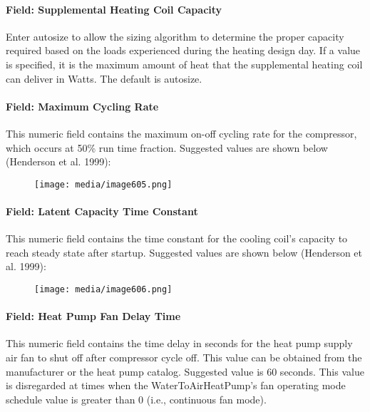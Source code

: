 \paragraph{Field: Supplemental Heating Coil Capacity}\label{field-supplemental-heating-coil-capacity-1}

Enter autosize to allow the sizing algorithm to determine the proper capacity required based on the loads experienced during the heating design day. If a value is specified, it is the maximum amount of heat that the supplemental heating coil can deliver in Watts. The default is autosize.

\paragraph{Field: Maximum Cycling Rate}\label{field-maximum-cycling-rate-000}

This numeric field contains the maximum on-off cycling rate for the compressor, which occurs at 50\% run time fraction. Suggested values are shown below (Henderson et al. 1999):

\begin{figure}[htbp]
\centering
\texttt{[image: media/image605.png]}
\caption{}
\end{figure}

\paragraph{Field: Latent Capacity Time Constant}\label{field-heat-pump-time-constant}

This numeric field contains the time constant for the cooling coil's capacity to reach steady state after startup. Suggested values are shown below (Henderson et al. 1999):

\begin{figure}[htbp]
\centering
\texttt{[image: media/image606.png]}
\caption{}
\end{figure}

\paragraph{Field: Heat Pump Fan Delay Time}\label{field-heat-pump-fan-delay-time}

This numeric field contains the time delay in seconds for the heat pump supply air fan to shut off after compressor cycle off. This value can be obtained from the manufacturer or the heat pump catalog. Suggested value is 60 seconds. This value is disregarded at times when the WaterToAirHeatPump's fan operating mode schedule value is greater than 0 (i.e., continuous fan mode).

